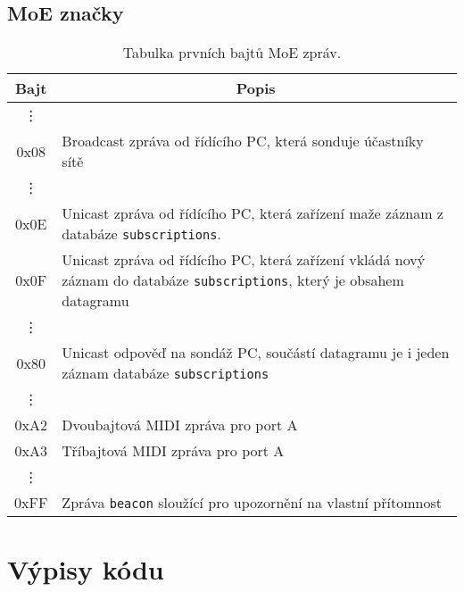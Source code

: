 \section{\acs{MoE} značky}\label{chpt:MoEZnacky}
\begin{table}[h]
	\centering
	\begin{tabular}{|  >{\ttfamily} c | p{} |}
		\hline
		\textnormal{Bajt} & \multicolumn{1}{|c|}{Popis} \\
		\hline \hline
		\vdots & \\
		
		0x08 & Broadcast zpráva od řídícího PC, která sonduje účastníky sítě \\
		
		\vdots & \\

		0x0E & Unicast zpráva od řídícího  PC, která zařízení maže záznam z databáze \texttt{subscriptions}. \\
		
		0x0F & Unicast zpráva od řídícího PC, která zařízení vkládá nový záznam do databáze \texttt{subscriptions}, který je obsahem datagramu \\
		
		\vdots & \\
		
		0x80 & Unicast odpověď na sondáž PC, součástí datagramu je i jeden záznam databáze \texttt{subscriptions} \\

		\vdots & \\

		0xA2 & Dvoubajtová \acs{MIDI} zpráva pro port A \\
		0xA3 & Tříbajtová \acs{MIDI} zpráva pro port A \\
		
		\vdots & \\
		
		0xFF & Zpráva \texttt{beacon} sloužící pro upozornění na vlastní přítomnost \\
		\hline
	\end{tabular}
	\caption{Tabulka prvních bajtů \acs{MoE} zpráv.}
\end{table}


\chapter{Výpisy kódu}
